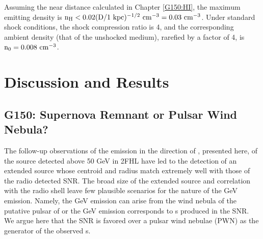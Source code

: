 Assuming the near distance calculated in Chapter \ref{G150:HI}, the maximum emitting density is ${\rm n_H < 0.02 (D / 1~kpc)^{-1/2}~cm^{-3} = 0.03~cm^{-3}}$. Under standard shock conditions, the shock compression ratio  is 4, and the corresponding ambient density (that of the unshocked medium), rarefied by a factor of 4, is  ${\rm n_0 = 0.008~cm^{-3}}$.



%
%
\section{Discussion and Results}\label{G150:Discuss}
\subsection{G150: Supernova Remnant  or Pulsar Wind Nebula?}\label{G150:PWNvsSNR}

The follow-up observations of the \gam{} emission in the direction of \Gone{}, presented here, of the source detected above 50 GeV in 2FHL have led to the detection of an extended \gam{} source whose centroid and radius match extremely well with those of the radio detected SNR. The broad size of the extended source and correlation with the radio shell leave few plausible scenarios for the nature of the GeV emission. Namely, the GeV emission can arise from the wind nebula of the putative pulsar of \Gone{} or the GeV emission corresponds to \gam{}s produced in the SNR. We argue here that the SNR is favored over a pulsar wind nebulae (PWN) as the generator of the observed \gam{}s.


